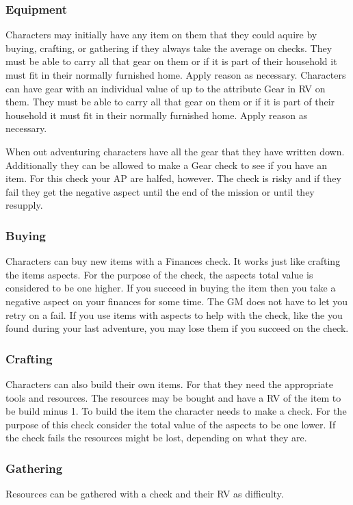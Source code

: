 \documentclass[11pt]{article}
\begin{document}
{\subsubsection{Equipment}
\label{sec:orga056818}
Characters may initially have any item on them that they could aquire by buying, crafting, or gathering if they always take the average on checks. They must be able to carry all that gear on them or if it is part of their household it must fit in their normally furnished home. Apply reason as necessary.
Characters can have gear with an individual value of up to the attribute Gear in RV on them. They must be able to carry all that gear on them or if it is part of their household it must fit in their normally furnished home. Apply reason as necessary.

When out adventuring characters have all the gear that they have written down. Additionally they can be allowed to make a Gear check to see if you have an item. For this check your AP are halfed, however. The check is risky and if they fail they get the negative aspect  until the end of the mission or until they resupply.
\subsubsection{Buying}
\label{sec:org4ab404f}
Characters can buy new items with a Finances check. It works just like crafting the items aspects. For the purpose of the check, the aspects total value is considered to be one higher. If you succeed in buying the item then you take a negative aspect  on your finances for some time. The GM does not have to let you retry on a fail. If you use items with aspects to help with the check, like the  you found during your last adventure, you may lose them if you succeed on the check.
\subsubsection{Crafting}
\label{sec:org11dca80}
Characters can also build their own items. For that they need the appropriate tools and resources. The resources may be bought and have a RV of the item to be build minus 1. To build the item the character needs to make a check. For the purpose of this check consider the total value of the aspects to be one lower. If the check fails the resources might be lost, depending on what they are.
\subsubsection{Gathering}
\label{sec:org465c47d}
Resources can be gathered with a check and their RV as difficulty.
}
\end{document}

